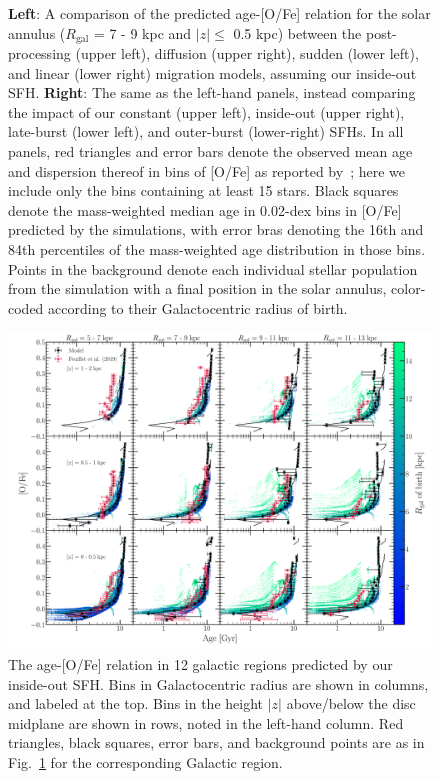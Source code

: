 \documentclass[fleqn, usenatbib]{mnras}
\begin{document}
\begin{figure}
\caption{
\textbf{Left}: A comparison of the predicted age-[O/Fe] relation for the 
solar annulus ($R_\text{gal}$ = 7 - 9 kpc and $\left|z\right|\leq$ 0.5 kpc) 
between the post-processing (upper left), diffusion (upper right), sudden 
(lower left), and linear (lower right) migration models, assuming our 
inside-out SFH. 
\textbf{Right}: The same as the left-hand panels, instead comparing the impact 
of our constant (upper left), inside-out (upper right), late-burst (lower 
left), and outer-burst (lower-right) SFHs. 
In all panels, red triangles and error bars denote the observed mean age and 
dispersion thereof in bins of [O/Fe] as reported by~\citet{Feuillet2019}; here 
we include only the bins containing at least 15 stars. Black squares denote 
the mass-weighted median age in 0.02-dex bins in [O/Fe] predicted by the 
simulations, with error bras denoting the 16th and 84th percentiles of the 
mass-weighted age distribution in those bins. Points in the background denote 
each individual stellar population from the simulation with a final position 
in the solar annulus, color-coded according to their Galactocentric radius of 
birth. 
} 
\label{fig:age_alpha} 
\end{figure} 

\begin{figure} 
\centering 
\includegraphics[scale = 0.32]{age_alpha_regions.pdf} 
\caption{The age-[O/Fe] relation in 12 galactic regions predicted by 
our inside-out SFH. Bins in Galactocentric radius are shown in columns, 
and labeled at the top. Bins in the height $\left|z\right|$ above/below the 
disc midplane are shown in rows, noted in the left-hand column. Red triangles, 
black squares, error bars, and background points are as in 
Fig.~\ref{fig:age_alpha} for the corresponding Galactic 
region. 
} 
\label{fig:age_alpha_regions} 
\end{figure} 
\end{document}
